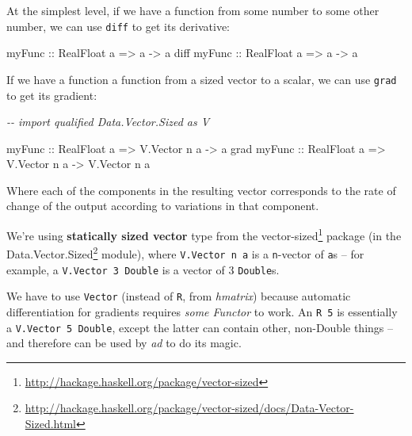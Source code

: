 \documentclass[]{article}
\newenvironment{Shaded}{}{}
\newcommand{\CommentTok}[1]{\textcolor[rgb]{0.38,0.63,0.69}{\textit{#1}}}
\newcommand{\DataTypeTok}[1]{\textcolor[rgb]{0.56,0.13,0.00}{#1}}
\newcommand{\NormalTok}[1]{#1}
\newcommand{\OtherTok}[1]{\textcolor[rgb]{0.00,0.44,0.13}{#1}}
\renewcommand{\href}[2]{#2\footnote{\url{#1}}}
\begin{document}
At the simplest level, if we have a function from some number to some other
number, we can use \texttt{diff} to get its derivative:

\begin{Shaded}
\begin{Highlighting}[]
\OtherTok{myFunc      ::} \DataTypeTok{RealFloat}\NormalTok{ a }\OtherTok{=\textgreater{}}\NormalTok{ a }\OtherTok{{-}\textgreater{}}\NormalTok{ a}
\NormalTok{diff}\OtherTok{ myFunc ::} \DataTypeTok{RealFloat}\NormalTok{ a }\OtherTok{=\textgreater{}}\NormalTok{ a }\OtherTok{{-}\textgreater{}}\NormalTok{ a}
\end{Highlighting}
\end{Shaded}

If we have a function a function from a sized vector to a scalar, we can use
\texttt{grad} to get its gradient:

\begin{Shaded}
\begin{Highlighting}[]
\CommentTok{{-}{-} import qualified Data.Vector.Sized as V}

\OtherTok{myFunc      ::} \DataTypeTok{RealFloat}\NormalTok{ a }\OtherTok{=\textgreater{}} \DataTypeTok{V.Vector}\NormalTok{ n a }\OtherTok{{-}\textgreater{}}\NormalTok{ a}
\NormalTok{grad}\OtherTok{ myFunc ::} \DataTypeTok{RealFloat}\NormalTok{ a }\OtherTok{=\textgreater{}} \DataTypeTok{V.Vector}\NormalTok{ n a }\OtherTok{{-}\textgreater{}} \DataTypeTok{V.Vector}\NormalTok{ n a}
\end{Highlighting}
\end{Shaded}

Where each of the components in the resulting vector corresponds to the rate of
change of the output according to variations in that component.

We're using \textbf{statically sized vector} type from the
\href{http://hackage.haskell.org/package/vector-sized}{vector-sized} package (in
the
\href{http://hackage.haskell.org/package/vector-sized/docs/Data-Vector-Sized.html}{Data.Vector.Sized}
module), where \texttt{V.Vector\ n\ a} is a \texttt{n}-vector of \texttt{a}s --
for example, a \texttt{V.Vector\ 3\ Double} is a vector of 3 \texttt{Double}s.

We have to use \texttt{Vector} (instead of \texttt{R}, from \emph{hmatrix})
because automatic differentiation for gradients requires \emph{some Functor} to
work. An \texttt{R\ 5} is essentially a \texttt{V.Vector\ 5\ Double}, except the
latter can contain other, non-Double things -- and therefore can be used by
\emph{ad} to do its magic.
\end{document}
